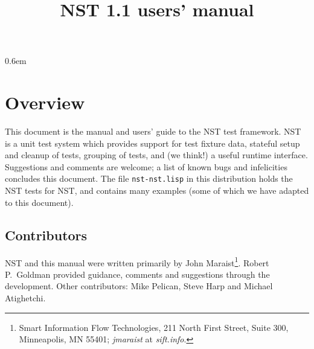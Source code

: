 \documentclass[draft]{article}
\title{NST 1.1 users' manual}
\begin{document}
\maketitle
\thispagestyle{empty}
\tableofcontents
\parskip 0.6em
\parindent 0pt

\section*{Overview}
This document is the manual and users' guide to the NST test
framework.  NST is a unit test system which provides support for test
fixture data, stateful setup and cleanup of tests, grouping of tests,
and (we think!) a useful runtime interface.  Suggestions and comments
are welcome; a list of known bugs and infelicities concludes this
document.  The file \texttt{nst-nst.lisp} in this distribution holds
the NST tests for NST, and contains many examples (some of which we
have adapted to this document).

\subsection*{Contributors}
NST and this manual were written primarily by John
Maraist\footnote{Smart Information Flow Technologies, 211 North First
  Street, Suite 300, Minneapolis, MN 55401; \textsl{jmaraist} at
  \textsl{sift.info}.}.  Robert P.\ Goldman provided guidance,
comments and suggestions through the development.  Other contributors:
Mike Pelican, Steve Harp and Michael Atighetchi.







\appendix
{}

\printindex
\end{document}
